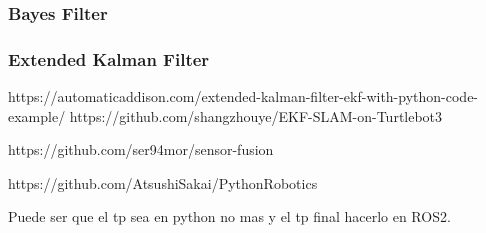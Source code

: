 \begin{frame}
	\frametitle{Bayes Filter}
	
	
	
\end{frame}

\begin{frame}
	\frametitle{Extended Kalman Filter}
	
    
    https://automaticaddison.com/extended-kalman-filter-ekf-with-python-code-example/
    https://github.com/shangzhouye/EKF-SLAM-on-Turtlebot3
    
    https://github.com/ser94mor/sensor-fusion
    
    https://github.com/AtsushiSakai/PythonRobotics
    
    Puede ser que el tp sea en python no mas y el tp final hacerlo en ROS2.
    
    
\end{frame}

